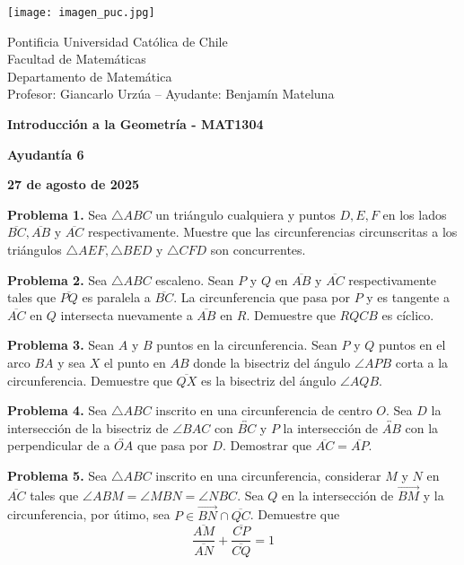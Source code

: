 \documentclass{article}
\begin{document}
\begin{minipage}{2.5cm}
    \texttt{[image: imagen\_puc.jpg]}
\end{minipage}
\begin{minipage}{14cm}
    {\sc Pontificia Universidad Católica de Chile\\
    Facultad de Matemáticas\\
    Departamento de Matemática\\
    Profesor: Giancarlo Urzúa -- Ayudante: Benjamín Mateluna}
\end{minipage}
\vspace{1ex}

{\centerline{\bf Introducción a la Geometría - MAT1304}
\centerline{\bf Ayudantía 6}}
\centerline{\bf 27 de agosto de 2025}

\vspace{1cm}
\noindent\textbf{Problema 1.} Sea $\triangle ABC$ un triángulo cualquiera y puntos $D,E,F$ en los
lados $\overline{BC}, \overline{AB}$ y $\overline{AC}$ respectivamente. Muestre que las 
circunferencias circunscritas a los triángulos $\triangle AEF,\triangle BED$ y $\triangle CFD$ son
concurrentes.

\vspace{5mm}
\noindent\textbf{Problema 2.} Sea $\triangle ABC$ escaleno. Sean $P$ y $Q$ en $\overline{AB}$ y
$\overline{AC}$ respectivamente tales que $\overline{PQ}$ es paralela a $\overline{BC}$. La 
circunferencia que pasa por $P$ y es tangente a $\overline{AC}$ en $Q$ intersecta nuevamente a 
$\overline{AB}$ en $R$. Demuestre que $RQCB$ es cíclico.

\vspace{5mm}
\noindent\textbf{Problema 3.} Sean $A$ y $B$ puntos en la circunferencia. Sean $P$ y $Q$ puntos en
el arco $BA$ y sea $X$ el punto en $AB$ donde la bisectriz del ángulo 
$\angle APB$ corta a la circunferencia. Demuestre que $\overline{QX}$ es la bisectriz del ángulo 
$\angle AQB$.

\vspace{5mm}
\noindent\textbf{Problema 4.} Sea $\triangle ABC$ inscrito en una circunferencia de centro $O$.
Sea $D$ la intersección de la bisectriz de $\angle BAC$ con $\overleftrightarrow{BC}$ y $P$ la
intersección de $\overleftrightarrow{AB}$ con la perpendicular de a $\overleftrightarrow{OA}$ que
pasa por $D$. Demostrar que $\overline{AC}=\overline{AP}$.

\vspace{5mm}
\noindent\textbf{Problema 5.} Sea $\triangle ABC$ inscrito en una circunferencia, considerar $M$
y $N$ en $\overline{AC}$ tales que $\angle ABM=\angle MBN=\angle NBC$. Sea $Q$ en la intersección
de $\overrightarrow{BM}$ y la circunferencia, por útimo, sea $P\in \overrightarrow{BN}\cap
\overline{QC}$. Demuestre que
\begin{equation*}
    \frac{\overline{AM}}{\overline{AN}}+\frac{\overline{CP}}{\overline{CQ}}=1
\end{equation*}

\end{document}
